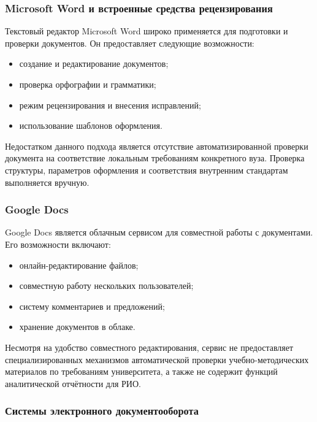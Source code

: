 \subsubsection{Microsoft Word и встроенные средства рецензирования}

Текстовый редактор Microsoft Word широко применяется для подготовки и проверки документов. Он предоставляет следующие возможности:

\begin{itemize}
	\item создание и редактирование документов;
	\item проверка орфографии и грамматики;
	\item режим рецензирования и внесения исправлений;
	\item использование шаблонов оформления.
\end{itemize}

Недостатком данного подхода является отсутствие автоматизированной проверки документа на соответствие локальным требованиям конкретного вуза. Проверка структуры, параметров оформления и соответствия внутренним стандартам выполняется вручную.

\subsubsection{Google Docs}

Google Docs является облачным сервисом для совместной работы с документами. Его возможности включают:

\begin{itemize}
	\item онлайн-редактирование файлов;
	\item совместную работу нескольких пользователей;
	\item систему комментариев и предложений;
	\item хранение документов в облаке.
\end{itemize}

Несмотря на удобство совместного редактирования, сервис не предоставляет специализированных механизмов автоматической проверки учебно-методических материалов по требованиям университета, а также не содержит функций аналитической отчётности для РИО.

\subsubsection{Системы электронного документооборота}

